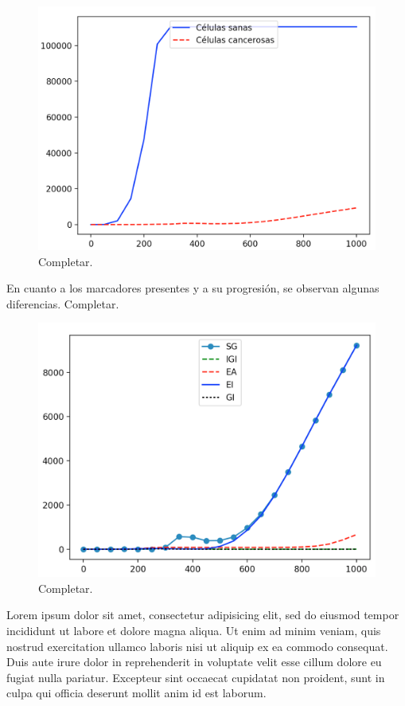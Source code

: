 \begin{figure}[h]
\centering
\includegraphics[scale=0.6]{figures/experiments/exp1/healthvscarcino}
\caption{Completar.}
\end{figure}

En cuanto a los marcadores presentes y a su progresión, se observan algunas diferencias. Completar.

\begin{figure}[h]
\centering
\includegraphics[scale=0.6]{figures/experiments/exp1/mutations}
\caption{Completar.}
\end{figure}

Lorem ipsum dolor sit amet, consectetur adipisicing elit, sed do eiusmod tempor incididunt ut labore et dolore magna aliqua.
Ut enim ad minim veniam, quis nostrud exercitation ullamco laboris nisi ut aliquip ex ea commodo consequat.
Duis aute irure dolor in reprehenderit in voluptate velit esse cillum dolore eu fugiat nulla pariatur.
Excepteur sint occaecat cupidatat non proident, sunt in culpa qui officia deserunt mollit anim id est laborum.

